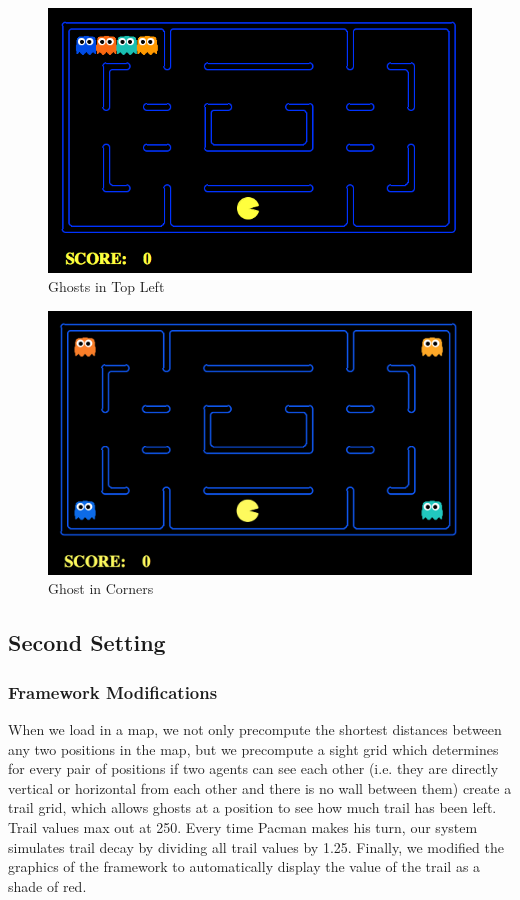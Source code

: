 \documentclass[11pt]{article}
\begin{document}
\begin{multicols}{2}
\begin{figure}[H]
	\includegraphics[width=\columnwidth]{maptogether.png}
	\caption{Ghosts in Top Left}
	\label{fig:maptogether}
\end{figure}

\begin{figure}[H]
	\includegraphics[width=\columnwidth]{mapcorners.png}
	\caption{Ghost in Corners}
	\label{fig:mapcorners}
\end{figure}


\subsection{Second Setting}

\subsubsection{Framework Modifications}
When we load in a map, we not only precompute the shortest distances between any two positions in the map, but we precompute a sight grid which determines for every pair of positions if two agents can see each other (i.e. they are directly vertical or horizontal from each other and there is no wall between them) create a trail grid, which allows ghosts at a position to see how much trail has been left. Trail values max out at 250. Every time Pacman makes his turn, our system simulates trail decay by dividing all trail values by 1.25.  Finally, we modified the graphics of the framework to automatically display the value of the trail as a shade of red.


\end{multicols}
\end{document}
